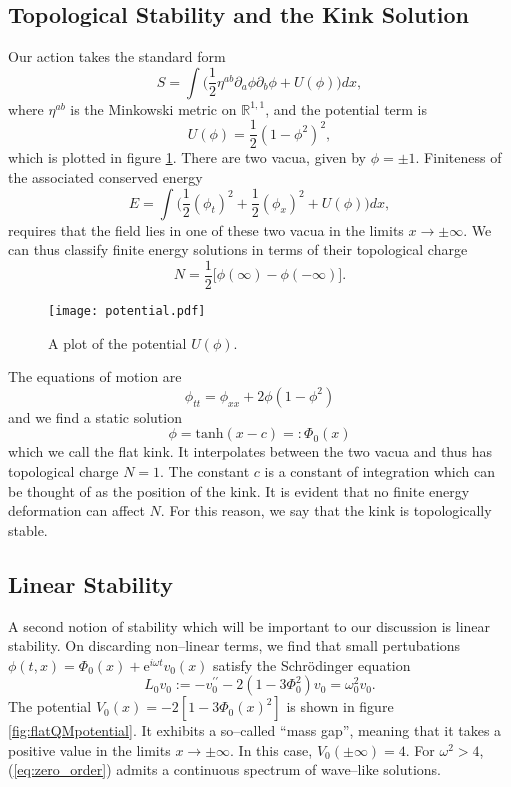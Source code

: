 \subsection{Topological Stability and the Kink Solution}
Our action takes the standard form
\[
S=\int\bigg( \frac{1}{2}\eta^{ab}\partial_a\phi\partial_b\phi + U(\phi)\bigg)dx,
\]
where $\eta^{ab}$ is the Minkowski metric on $\mathbb{R}^{1,1}$, and the potential term is
\[
U(\phi)=\frac{1}{2}(1-\phi^2)^2,
\]
which is plotted in figure \ref{fig:potential}. There are two vacua, given by $\phi=\pm 1$. Finiteness of the associated conserved energy
\[
E = \int \bigg( \frac{1}{2}(\phi_t)^2 + \frac{1}{2}(\phi_x)^2 + U(\phi) \bigg)dx,
\]
requires that the field lies in one of these two vacua in the limits $x\rightarrow \pm \infty$. We can thus classify finite energy solutions in terms of their topological charge
\begin{equation}
\label{eq:N}
N = \frac{1}{2}\big[\phi(\infty) -\phi(-\infty)\big].
\end{equation}


\begin{figure}
\texttt{[image: potential.pdf]}
\caption{\label{fig:potential}A plot of the potential $U(\phi)$.}
\end{figure}

The equations of motion are
\begin{equation}
\label{eom:R11}
\phi_{tt}=\phi_{xx} + 2\phi(1-\phi^2)
\end{equation}
and we find a static solution
\begin{equation}
\label{eq:tanh}
\phi=\mathrm{tanh}(x-c)=:\Phi_0(x)
\end{equation}
which we call the flat kink. It interpolates between the two vacua and thus has topological charge $N=1$. The constant $c$ is a constant of integration which can be thought of as the position of the kink. It is evident that no finite energy deformation can affect $N$. For this reason, we say that the kink is topologically stable.

\subsection{Linear Stability}

A second notion of stability which will be important to our discussion is linear stability. On discarding non--linear terms, we find that small pertubations $\phi(t,x)=\Phi_0(x)+\mathrm{e}^{i\omega t}v_0(x)$ satisfy the Schr\"odinger equation
\begin{equation}
\label{eq:zero_order}
L_0v_0:=-v_0^{\prime\prime} - 2(1-3\Phi_0^2)v_0 = \omega^2_0v_0.
\end{equation}
The potential $V_0(x)=-2[1-3\Phi_0(x)^2]$ is shown in figure \ref{fig:flatQMpotential}. It exhibits a so--called ``mass gap'', meaning that it takes a positive value in the limits $x\rightarrow\pm\infty$. In this case, $V_0(\pm\infty)=4$. For $\omega^2>4$, (\ref{eq:zero_order}) admits a continuous spectrum of wave--like solutions.

